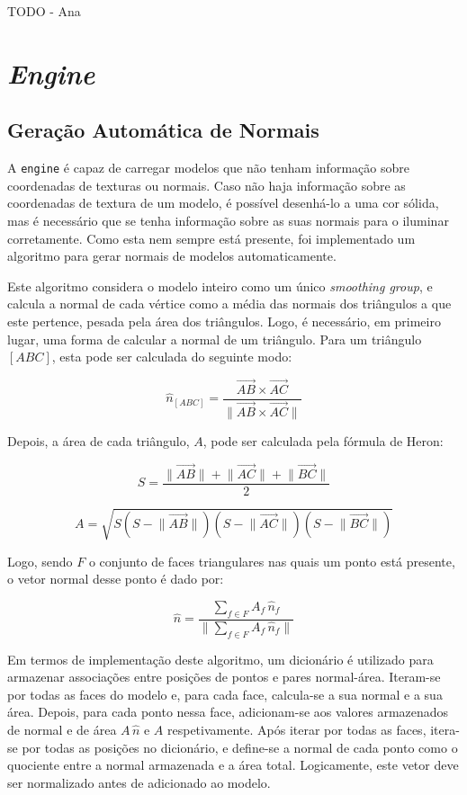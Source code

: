 \documentclass[12pt, a4paper]{article}
\begin{document}
{\color{red} TODO - Ana}

\section{\emph{Engine}}

\subsection{Geração Automática de Normais}

A \texttt{engine} é capaz de carregar modelos que não tenham informação sobre coordenadas de
texturas ou normais. Caso não haja informação sobre as coordenadas de textura de um modelo, é
possível desenhá-lo a uma cor sólida, mas é necessário que se tenha informação sobre as suas normais
para o iluminar corretamente. Como esta nem sempre está presente, foi implementado um algoritmo para
gerar normais de modelos automaticamente.

Este algoritmo considera o modelo inteiro como um único \emph{smoothing group}, e calcula a normal
de cada vértice como a média das normais dos triângulos a que este pertence, pesada pela área dos
triângulos. Logo, é necessário, em primeiro lugar, uma forma de calcular a normal de um triângulo.
Para um triângulo $[ABC]$, esta pode ser calculada do seguinte modo:

$$
\hat{n}_{[ABC]} = \frac{
    \overrightarrow{AB} \times \overrightarrow{AC}
}{
    \lVert \overrightarrow{AB} \times \overrightarrow{AC} \rVert
}
$$

Depois, a área de cada triângulo, $A$, pode ser calculada pela fórmula de Heron:

$$
S = \frac{
    \lVert \overrightarrow{AB} \rVert +
    \lVert \overrightarrow{AC} \rVert +
    \lVert \overrightarrow{BC} \rVert
}{
    2
}
$$

$$
A = \sqrt{
    S
    \left ( S - \lVert \overrightarrow{AB} \rVert \right )
    \left ( S - \lVert \overrightarrow{AC} \rVert \right )
    \left ( S - \lVert \overrightarrow{BC} \rVert \right )
}
$$

Logo, sendo $F$ o conjunto de faces triangulares nas quais um ponto está presente, o vetor normal
desse ponto é dado por:

$$
\hat{n} = \frac{
    \sum_{f \in F} {A_f \, \hat{n}_f}
}{
    \lVert \sum_{f \in F} {A_f \, \hat{n}_f} \rVert
}
$$

Em termos de implementação deste algoritmo, um dicionário é utilizado para armazenar associações
entre posições de pontos e pares normal-área. Iteram-se por todas as faces do modelo e, para
cada face, calcula-se a sua normal e a sua área. Depois, para cada ponto nessa face, adicionam-se
aos valores armazenados de normal e de área $A \, \hat{n}$ e $A$ respetivamente. Após iterar por
todas as faces, itera-se por todas as posições no dicionário, e define-se a normal de cada ponto
como o quociente entre a normal armazenada e a área total. Logicamente, este vetor deve ser
normalizado antes de adicionado ao modelo.
\end{document}
